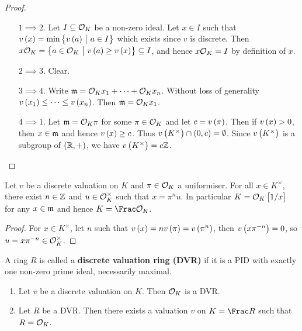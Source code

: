 \begin{proof}
\hfill
\begin{itemize}[leftmargin=0.5in]
\item[$ 1 \implies 2 $.] Let $ I \subseteq \mathcal{O}_K $ be a non-zero ideal. Let $ x \in I $ such that $ v\br{x} = \min \cbr{v\br{a} \st a \in I} $ which exists since $ v $ is discrete. Then $ x\OOO_K = \cbr{a \in \OOO_K \st v\br{a} \ge v\br{x}} \subseteq I $, and hence $ x\mathcal{O}_K = I $ by definition of $ x $.
\item[$ 2 \implies 3 $.] Clear.
\item[$ 3 \implies 4 $.] Write $ \mathfrak{m} = \mathcal{O}_Kx_1 + \dots + \mathcal{O}_Kx_n $. Without loss of generality $ v\br{x_1} \le \dots \le v\br{x_n} $. Then $ \mathfrak{m} = \mathcal{O}_Kx_1 $.
\item[$ 4 \implies 1 $.] Let $ \mathfrak{m} = \mathcal{O}_K\pi $ for some $ \pi \in \mathcal{O}_K $ and let $ c = v\br{\pi} $. Then if $ v\br{x} > 0 $, then $ x \in \mathfrak{m} $ and hence $ v\br{x} \ge c $. Thus $ v\br{K^\times} \cap \br{0, c} = \emptyset $. Since $ v\br{K^\times} $ is a subgroup of $ \br{\RR, +} $, we have $ v\br{K^\times} = c\ZZ $.
\end{itemize}
\end{proof}

\begin{lemma}
Let $ v $ be a discrete valuation on $ K $ and $ \pi \in \mathcal{O}_K $ a uniformiser. For all $ x \in K^\times $, there exist $ n \in \mathbb{Z} $ and $ u \in \mathcal{O}_K^\times $ such that $ x = \pi^nu $. In particular $ K = \OOO_K\sbr{1 / x} $ for any $ x \in \mathfrak{m} $ and hence $ K = \Frac \OOO_K $.
\end{lemma}

\begin{proof}
For $ x \in K^\times $, let $ n $ such that $ v\br{x} = nv\br{\pi} = v\br{\pi^n} $, then $ v\br{x\pi^{-n}} = 0 $, so $ u = x\pi^{-n} \in \mathcal{O}_K^\times $.
\end{proof}

\begin{definition}
A ring $ R $ is called a \textbf{discrete valuation ring (DVR)} if it is a PID with exactly one non-zero prime ideal, necessarily maximal.
\end{definition}

\begin{lemma}
\hfill
\begin{enumerate}
\item Let $ v $ be a discrete valuation on $ K $. Then $ \mathcal{O}_K $ is a DVR.
\item Let $ R $ be a DVR. Then there exists a valuation $ v $ on $ K = \Frac R $ such that $ R = \mathcal{O}_K $.
\end{enumerate}
\end{lemma}

